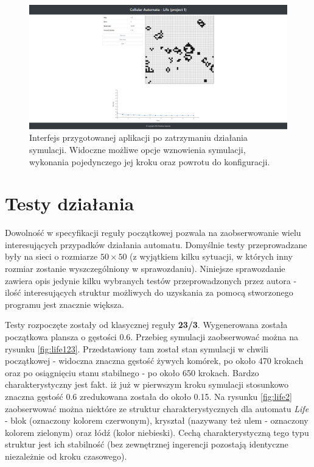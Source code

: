 \documentclass[12pt] {article}
\begin{document}
\begin{figure}[H]
\centering
\includegraphics[width=\textwidth]{res/interface2.png}
\caption{Interfejs przygotowanej aplikacji po zatrzymaniu działania symulacji. Widoczne możliwe opcje wznowienia symulacji, wykonania pojedynczego jej kroku oraz powrotu do konfiguracji.}
\label{fig:rys2}
\end{figure}


\section{Testy działania}
Dowolność w specyfikacji reguły początkowej pozwala na zaobserwowanie wielu interesujących przypadków działania automatu. Domyślnie testy przeprowadzane były na sieci o rozmiarze $50\times50$ (z wyjątkiem kilku sytuacji, w których inny rozmiar zostanie wyszczególniony w sprawozdaniu). Niniejsze sprawozdanie zawiera opis jedynie kilku wybranych testów przeprowadzonych przez autora - ilość interesujących struktur możliwych do uzyskania za pomocą stworzonego programu jest znacznie większa.


Testy rozpoczęte zostały od klasycznej reguły \textbf{23/3}. Wygenerowana została początkowa plansza o gęstości $0.6$. Przebieg symulacji zaobserwować można na rysunku \ref{fig:life123}. Przedstawiony tam został stan symulacji w chwili początkowej - widoczna znaczna gęstość żywych komórek, po około 470 krokach oraz po osiągnięciu stanu stabilnego - po około 650 krokach. Bardzo charakterystyczny jest fakt. iż już w pierwszym kroku symulacji stosunkowo znaczna gęstość 0.6 zredukowana została do około 0.15. Na rysunku \ref{fig:life2} zaobserwować można niektóre ze struktur charakterystycznych dla automatu \textit{Life} - blok (oznaczony kolorem czerwonym), kryształ (nazywany też ulem - oznaczony kolorem zielonym) oraz łódź (kolor niebieski). Cechą charakterystyczną tego typu struktur jest ich stabilność (bez zewnętrznej ingerencji pozostają identyczne niezależnie od kroku czasowego). 
\end{document}
